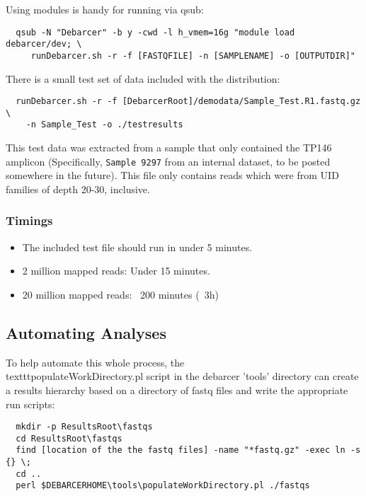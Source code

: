\documentclass{article}
\begin{document}
Using modules is handy for running via qsub:

\begin{verbatim}
  qsub -N "Debarcer" -b y -cwd -l h_vmem=16g "module load debarcer/dev; \ 
	 runDebarcer.sh -r -f [FASTQFILE] -n [SAMPLENAME] -o [OUTPUTDIR]"
\end{verbatim}

There is a small test set of data included with the distribution:

\begin{verbatim}
  runDebarcer.sh -r -f [DebarcerRoot]/demodata/Sample_Test.R1.fastq.gz \
	-n Sample_Test -o ./testresults
\end{verbatim}

This test data was extracted from a sample that only contained the TP146 amplicon
\big(Specifically, \texttt{Sample 9297} from an internal dataset, to be posted somewhere in the future\big).
This file only contains reads which were from UID families of depth 20-30, inclusive.

\subsubsection{Timings}

\begin{itemize}
	\item The included test file should run in under 5 minutes.
	\item 2 million mapped reads: Under 15 minutes.
	\item 20 million mapped reads: ~200 minutes (~3h)
\end{itemize}


\subsection{Automating Analyses}

To help automate this whole process, the \\texttt{populateWorkDirectory.pl} script in the 
debarcer 'tools' directory can create a results hierarchy based on a
directory of fastq files and write the appropriate run scripts:

\begin{verbatim}
  mkdir -p ResultsRoot\fastqs
  cd ResultsRoot\fastqs
  find [location of the the fastq files] -name "*fastq.gz" -exec ln -s {} \;
  cd ..
  perl $DEBARCERHOME\tools\populateWorkDirectory.pl ./fastqs
\end{verbatim}
\end{document}
